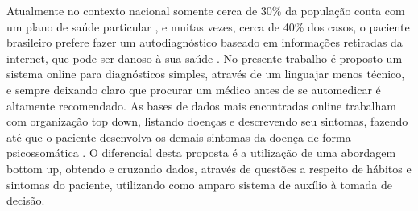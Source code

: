      
\begin{resumo} 
  Atualmente no contexto nacional somente cerca de 30\% da população conta com um plano de saúde particular \cite{brunobocchini2018}, e muitas vezes, cerca de 40\% dos casos, o paciente brasileiro prefere fazer um autodiagnóstico baseado em informações retiradas da internet, que pode ser danoso à sua saúde \cite{vanessathees2018}.
  No presente trabalho é proposto um sistema online para diagnósticos simples, através de um linguajar menos técnico, e sempre deixando claro que procurar um médico antes de se automedicar é altamente recomendado.
  As bases de dados mais encontradas online trabalham com organização top down, listando doenças e descrevendo seu sintomas, fazendo até que o paciente desenvolva os demais sintomas da doença de forma psicossomática \cite{contaifercavalcante2018}.
  O diferencial desta proposta é a utilização de uma abordagem bottom up, obtendo e cruzando dados, através de questões a respeito de hábitos e sintomas do paciente, utilizando como amparo sistema de auxílio à tomada de decisão.
\end{resumo}